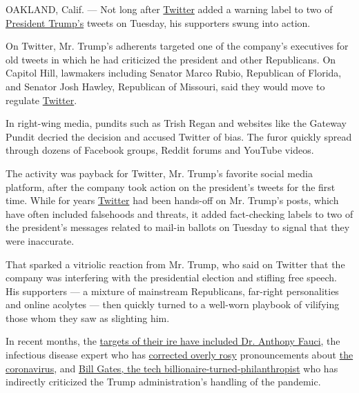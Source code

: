 OAKLAND, Calif. --- Not long after
\href{https://www.nytimes.com/2020/05/28/us/politics/trump-order-social-media.html}{Twitter}
added a warning label to two of
\href{https://www.nytimes.com/2020/05/28/us/politics/trump-order-social-media.html}{President
Trump's} tweets on Tuesday, his supporters swung into action.

On Twitter, Mr. Trump's adherents targeted one of the company's
executives for old tweets in which he had criticized the president and
other Republicans. On Capitol Hill, lawmakers including Senator Marco
Rubio, Republican of Florida, and Senator Josh Hawley, Republican of
Missouri, said they would move to regulate
\href{https://www.nytimes.com/2020/05/29/technology/trump-twitter.html}{Twitter}.

In right-wing media, pundits such as Trish Regan and websites like the
Gateway Pundit decried the decision and accused Twitter of bias. The
furor quickly spread through dozens of Facebook groups, Reddit forums
and YouTube videos.

The activity was payback for Twitter, Mr. Trump's favorite social media
platform, after the company took action on the president's tweets for
the first time. While for years
\href{https://www.nytimes.com/2020/05/29/technology/trump-twitter.html}{Twitter}
had been hands-off on Mr. Trump's posts, which have often included
falsehoods and threats, it added fact-checking labels to two of the
president's messages related to mail-in ballots on Tuesday to signal
that they were inaccurate.

That sparked a vitriolic reaction from Mr. Trump, who said on Twitter
that the company was interfering with the presidential election and
stifling free speech. His supporters --- a mixture of mainstream
Republicans, far-right personalities and online acolytes --- then
quickly turned to a well-worn playbook of vilifying those whom they saw
as slighting him.

In recent months, the
\href{https://www.nytimes.com/2020/03/28/technology/coronavirus-fauci-trump-conspiracy-target.html}{targets
of their ire have included Dr. Anthony Fauci}, the infectious disease
expert who has
\href{https://www.nytimes.com/2020/03/23/us/politics/coronavirus-trump-fauci.html}{corrected
overly rosy} pronouncements about
\href{https://www.nytimes.com/interactive/2020/world/coronavirus-maps.html}{the
coronavirus}, and
\href{https://www.nytimes.com/2020/04/17/technology/bill-gates-virus-conspiracy-theories.html}{Bill
Gates, the tech billionaire-turned-philanthropist} who has indirectly
criticized the Trump administration's handling of the pandemic.

